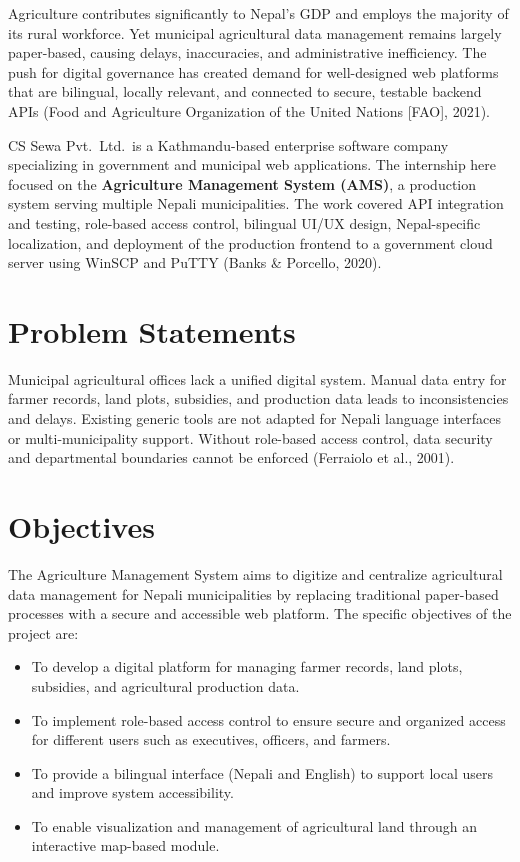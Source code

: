 \documentclass[12pt,a4paper]{report}
\begin{document}
Agriculture contributes significantly to Nepal's GDP and employs the majority of its
rural workforce. Yet municipal agricultural data management remains largely paper-based,
causing delays, inaccuracies, and administrative inefficiency. The push for digital
governance has created demand for well-designed web platforms that are bilingual,
locally relevant, and connected to secure, testable backend APIs (Food and Agriculture
Organization of the United Nations [FAO], 2021).

CS Sewa Pvt.\ Ltd.\ is a Kathmandu-based enterprise software company specializing in
government and municipal web applications. The internship here focused on the
\textbf{Agriculture Management System (AMS)}, a production system serving multiple
Nepali municipalities. The work covered API integration and testing, role-based access
control, bilingual UI/UX design, Nepal-specific localization, and deployment of the
production frontend to a government cloud server using WinSCP and PuTTY
(Banks \& Porcello, 2020).

\section{Problem Statements}

Municipal agricultural offices lack a unified digital system. Manual data entry for farmer
records, land plots, subsidies, and production data leads to inconsistencies and delays.
Existing generic tools are not adapted for Nepali language interfaces or multi-municipality
support. Without role-based access control, data security and departmental boundaries
cannot be enforced (Ferraiolo et al., 2001).

\section{Objectives}

The Agriculture Management System aims to digitize and centralize agricultural data management
for Nepali municipalities by replacing traditional paper-based processes with a secure and
accessible web platform. The specific objectives of the project are:

\begin{itemize}

\item To develop a digital platform for managing farmer records, land plots, subsidies,
      and agricultural production data.

\item To implement role-based access control to ensure secure and organized access
      for different users such as executives, officers, and farmers.

\item To provide a bilingual interface (Nepali and English) to support local users
      and improve system accessibility.

\item To enable visualization and management of agricultural land through an
      interactive map-based module.

\end{itemize}
\end{document}
